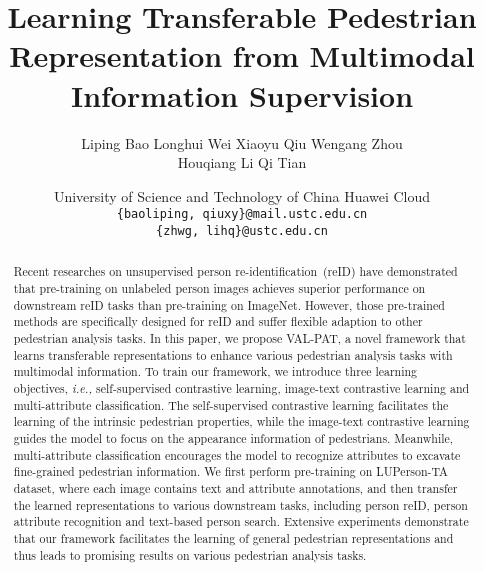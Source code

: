 \documentclass[final]{cvpr}
\begin{document}
\title{Learning Transferable Pedestrian Representation from  Multimodal\\ Information Supervision}

\author{Liping Bao\quad
		Longhui Wei\quad
		Xiaoyu Qiu\quad
		Wengang Zhou\quad \\
		Houqiang Li\quad 
		Qi Tian
		\and
		University of Science and Technology of China \quad Huawei Cloud  \\
		{\tt\small \{baoliping, qiuxy\}@mail.ustc.edu.cn}  \\
		{\tt\small \{zhwg, lihq\}@ustc.edu.cn} 
	}
\maketitle

\begin{abstract}
Recent researches on unsupervised person re-identification~(reID) have demonstrated that pre-training on unlabeled person images achieves superior performance on downstream reID tasks than pre-training on ImageNet.
However, those pre-trained methods are specifically designed for reID and suffer flexible adaption to other pedestrian analysis tasks.
In this paper, we propose VAL-PAT, a novel framework that learns transferable representations to enhance various pedestrian analysis tasks with multimodal information. 
To train our framework, we introduce three learning objectives, \emph{i.e.,} self-supervised contrastive learning, image-text contrastive learning and multi-attribute classification.
The self-supervised contrastive learning facilitates the learning of the intrinsic pedestrian properties, 
while the image-text contrastive learning guides the model to focus on the appearance information of pedestrians. Meanwhile, multi-attribute classification encourages the model to recognize attributes to excavate fine-grained pedestrian information. 
We first perform pre-training on LUPerson-TA dataset, where each image contains text and attribute annotations, and then transfer the learned representations to various downstream tasks, including person reID, person attribute recognition and text-based person search.
Extensive experiments demonstrate that our framework facilitates the learning of general pedestrian representations and thus leads to promising results on various pedestrian analysis tasks. 
\end{abstract}
\vspace{-4mm}
\end{document}
